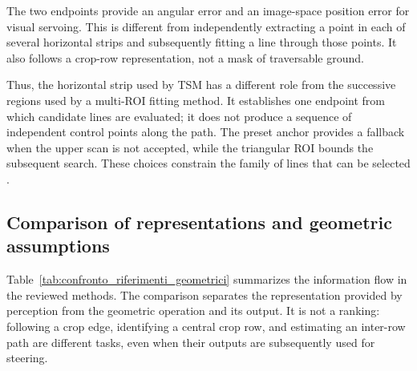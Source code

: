 The two endpoints provide an angular error and an image-space position
error for visual servoing. This is different from independently extracting
a point in each of several horizontal strips and subsequently fitting a
line through those points. It also follows a crop-row representation,
not a mask of traversable ground.

Thus, the horizontal strip used by TSM has a different role from the
successive regions used by a multi-ROI fitting method. It establishes
one endpoint from which candidate lines are evaluated; it does not
produce a sequence of independent control points along the path.
The preset anchor provides a fallback when the upper scan is not
accepted, while the triangular ROI bounds the subsequent search.
These choices constrain the family of lines that can be selected
\cite[Section~4.2, Algorithm~1]{silva2023rowdetection}.

\subsection{Comparison of representations and geometric assumptions}
\label{subsec:confronto_riferimenti}

Table~\ref{tab:confronto_riferimenti_geometrici} summarizes the information
flow in the reviewed methods. The comparison separates the representation
provided by perception from the geometric operation and its output.
It is not a ranking: following a crop edge, identifying a central crop
row, and estimating an inter-row path are different tasks, even when
their outputs are subsequently used for steering.

